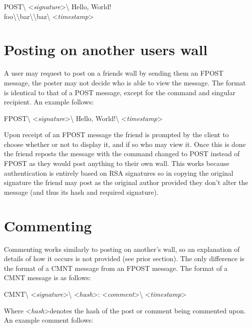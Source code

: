 \begin{center}
POST\textbackslash
\textless \textit{signature}\textgreater\textbackslash
Hello, World!\\
foo\textbackslash\textbackslash bar\textbackslash\textbackslash baz\textbackslash
\textless \textit{timestamp}\textgreater
\end{center}

\section{Posting on another users wall}
A user may request to post on a friends wall by sending them an FPOST message,
the poster may not decide who is able to view the message. The format is
identical to that of a POST message, except for the command and singular
recipient. An example follows:

\begin{center}
FPOST\textbackslash
\textless \textit{signature}\textgreater\textbackslash
Hello, World!\textbackslash
\textless \textit{timestamp}\textgreater
\end{center}

Upon receipt of an FPOST message the friend is prompted by the client to choose
whether or not to display it, and if so who may view it. Once this is done the
friend reposts the message with the command changed to POST instead of FPOST as
they would post anything to their own wall. This works because authentication is
entirely based on RSA signatures so in copying the original signature the friend
may post as the original author provided they don't alter the message (and thus
its hash and required signature).

\section{Commenting}
Commenting works similarly to posting on another's wall, so an explanation of
details of how it occurs is not provided (see prior section). The only
difference is the format of a CMNT message from an FPOST message. The format of
a CMNT message is as follows:

\begin{center}
CMNT\textbackslash
\textless \textit{signature}\textgreater\textbackslash
\textless \textit{hash}\textgreater:
\textless \textit{comment}\textgreater\textbackslash
\textless \textit{timestamp}\textgreater
\end{center}

Where \textless \textit{hash}\textgreater denotes the hash of the post or
comment being commented upon. An example comment follows:

